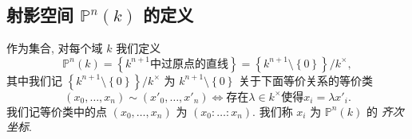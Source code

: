 \subsection{射影空间 \texorpdfstring{\( \mathbb{P}^n(k) \)}{Pn(k)} 的定义}

作为集合, 对每个域 \( k \) 我们定义
\[
  \mathbb{P}^n(k) = \left\lbrace k^{n + 1}\text{中过原点的直线} \right\rbrace =
  \left\lbrace k^{n + 1} \setminus \left\lbrace 0 \right\rbrace \right\rbrace /
  k^{\times},
\]
其中我们记 \( \left\lbrace k^{n + 1} \setminus \left\lbrace 0 \right\rbrace
\right\rbrace / k^{\times} \) 为 \( k^{n + 1} \setminus \left\lbrace 0
\right\rbrace \) 关于下面等价关系的等价类
\[
  (x_0, \ldots, x_n) \sim (x'_0, \ldots, x'_n) \iff \text{存在} \lambda \in
  k^{\times} \text{使得} x_i = \lambda x'_i.
\]
我们记等价类中的点 \( (x_0, \ldots, x_n) \) 为 \( (x_0: \ldots :x_n) \). 我们称
\( x_i \) 为 \( \mathbb{P}^n(k) \) 的 \emph{齐次坐标}.

